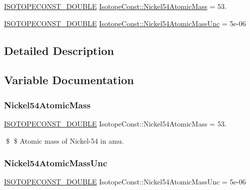 \begin{DoxyCompactItemize}
\item 
\mbox{\hyperlink{group___isotope_const-_macros_ga8f45a7272ce02c0b4c65c44636ed719a}{I\+S\+O\+T\+O\+P\+E\+C\+O\+N\+S\+T\+\_\+\+D\+O\+U\+B\+LE}} \mbox{\hyperlink{group___isotope_const-_nickel-_ni54_ga5d63b37baea5d1f38338783744e0656b}{Isotope\+Const\+::\+Nickel54\+Atomic\+Mass}} = 53.
\item 
\mbox{\hyperlink{group___isotope_const-_macros_ga8f45a7272ce02c0b4c65c44636ed719a}{I\+S\+O\+T\+O\+P\+E\+C\+O\+N\+S\+T\+\_\+\+D\+O\+U\+B\+LE}} \mbox{\hyperlink{group___isotope_const-_nickel-_ni54_ga7932948e6688125815b72b9a1aae61b0}{Isotope\+Const\+::\+Nickel54\+Atomic\+Mass\+Unc}} = 5e-\/06
\end{DoxyCompactItemize}


\subsection{Detailed Description}


\subsection{Variable Documentation}
\mbox{\label{group___isotope_const-_nickel-_ni54_ga5d63b37baea5d1f38338783744e0656b}} 
\subsubsection{\texorpdfstring{Nickel54\+Atomic\+Mass}{Nickel54AtomicMass}}
{\footnotesize\ttfamily \mbox{\hyperlink{group___isotope_const-_macros_ga8f45a7272ce02c0b4c65c44636ed719a}{I\+S\+O\+T\+O\+P\+E\+C\+O\+N\+S\+T\+\_\+\+D\+O\+U\+B\+LE}} Isotope\+Const\+::\+Nickel54\+Atomic\+Mass = 53.}

\$ \$ Atomic mass of Nickel-\/54 in amu. \mbox{\label{group___isotope_const-_nickel-_ni54_ga7932948e6688125815b72b9a1aae61b0}} 
\subsubsection{\texorpdfstring{Nickel54\+Atomic\+Mass\+Unc}{Nickel54AtomicMassUnc}}
{\footnotesize\ttfamily \mbox{\hyperlink{group___isotope_const-_macros_ga8f45a7272ce02c0b4c65c44636ed719a}{I\+S\+O\+T\+O\+P\+E\+C\+O\+N\+S\+T\+\_\+\+D\+O\+U\+B\+LE}} Isotope\+Const\+::\+Nickel54\+Atomic\+Mass\+Unc = 5e-\/06}

